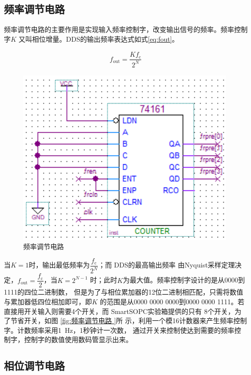 \documentclass[twoside, openright]{article}
\begin{document}
\subsection{频率调节电路}%
\label{sub:频率调节电路}

频率调节电路的主要作用是实现输入频率控制字，改变输出信号的频率。频率控制字$ K $
又叫相位增量。DDS的输出频率表达式如式\ref{eq:fout}。

\begin{align}
	f_\mathrm{out} = \dfrac{Kf_\mathrm{c}}{2^N}
		\label{eq:fout}
\end{align}

\begin{figure}
	\centering
	\includegraphics[width=\linewidth]{fr.png}
	\caption{频率调节电路}
	\label{fig:频率调节电路}
\end{figure}

当$ K = 1 $时，输出最低频率为$ \dfrac{f_\mathrm{c}}{2^N} $；而 DDS的最高输出频率
由Nyquist采样定理决定，$ f_\mathrm{out} = \dfrac{f_\mathrm{c}}{2} $，当$ K =
2^{N-1} $ 时；此时$ K $为最大值。频率控制字设计的是从0000到 1111的四位二进制数，
但是为了与相位累加器的12位二进制相匹配，只需将数值与累加器低四位相加即可，即$ K
$ 的范围是从0000 0000 0000到0000 0000 1111。若直接用开关输入则需要4个开关，而
SmartSOPC实验箱提供的只有 8个开关，为了节省开关，如图 \ref{fig:频率调节电路 }所
示，利用一个模16计数器来产生频率控制字。计数频率采用\SI{1}{\Hz}，1秒钟计一次数，
通过开关来控制使达到需要的频率控制字，控制字的数值使用数码管显示出来。

\subsection{相位调节电路}%
\label{sub:相位调节电路}
\end{document}
